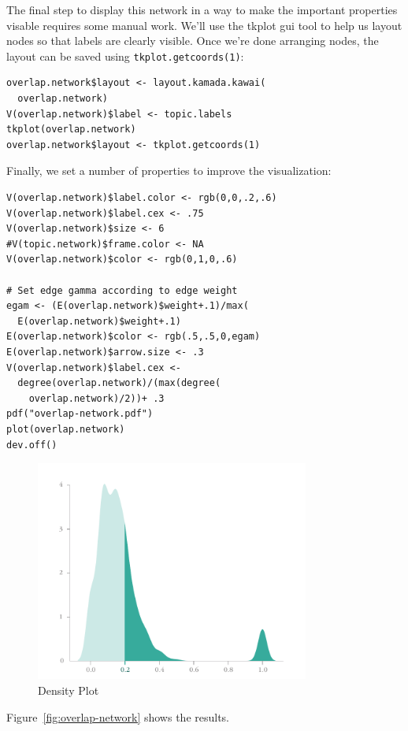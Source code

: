 \documentclass[%
	final,
	notitlepage,
	narroweqnarray,
	inline,
	]{ieee}
\begin{document}
The final step to display this network in a way to make the
important properties visable requires some manual work.  We'll use the
tkplot gui tool to help us layout nodes so that labels are clearly
visible. Once we're done arranging nodes, the layout can be saved
using {\tt tkplot.getcoords(1)}:


\begin{verbatim}
overlap.network$layout <- layout.kamada.kawai(
  overlap.network)
V(overlap.network)$label <- topic.labels
tkplot(overlap.network)
overlap.network$layout <- tkplot.getcoords(1)
\end{verbatim}

\noindent Finally, we set a number of properties to improve the
visualization:


\begin{verbatim}
V(overlap.network)$label.color <- rgb(0,0,.2,.6)
V(overlap.network)$label.cex <- .75
V(overlap.network)$size <- 6
#V(topic.network)$frame.color <- NA
V(overlap.network)$color <- rgb(0,1,0,.6)

# Set edge gamma according to edge weight
egam <- (E(overlap.network)$weight+.1)/max(
  E(overlap.network)$weight+.1)
E(overlap.network)$color <- rgb(.5,.5,0,egam)
E(overlap.network)$arrow.size <- .3
V(overlap.network)$label.cex <- 
  degree(overlap.network)/(max(degree(
    overlap.network)/2))+ .3
pdf("overlap-network.pdf")
plot(overlap.network)
dev.off()
\end{verbatim}

\begin{figure}
\centering
\includegraphics[width=90mm]{density.pdf}
\caption{Density Plot}
\label{fig:density}
\end{figure}

\noindent Figure~\ref{fig:overlap-network} shows the results.
\end{document}
